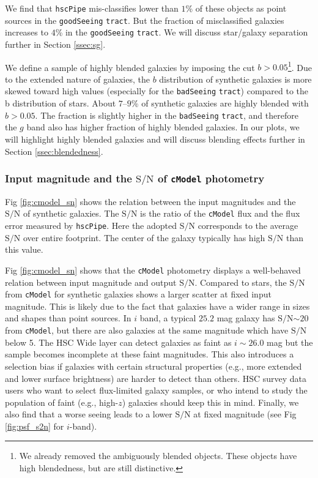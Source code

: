 \documentclass[useamsfonts]{pasj01}
\def\hscpipe{\texttt{hscPipe}}
\def\cmodel{\texttt{cModel}}
\def\tract{\texttt{tract}}
\def\s2n{{$\mathrm{S}/\mathrm{N}$}}
\begin{document}
    We find that \hscpipe{} mis-classifies lower than $1$\% of these objects as 
    point sources in the \texttt{goodSeeing} \tract{}.
    But the fraction of misclassified galaxies increases to $4$\% in the
    \texttt{goodSeeing} \tract{}. 
    We will discuss star/galaxy separation further in Section \ref{ssec:sg}.

    We define a sample of highly blended galaxies by imposing the cut 
    $b>0.05$\footnote{We already removed the ambiguously blended objects. 
    These objects have high blendedness, but are still distinctive.}.
    Due to the extended nature of galaxies, the $b$ distribution of synthetic 
    galaxies is more skewed toward high values (especially for the \texttt{badSeeing}
    \tract{}) compared to the b distribution of stars.
    About $7$--$9$\% of synthetic galaxies are highly blended with $b>0.05$.
    The fraction is slightly higher in the \texttt{badSeeing} \tract{}, and 
    therefore the $g$ band also has higher fraction of highly blended galaxies.
    In our plots, we will highlight highly blended galaxies and will discuss 
    blending effects further in Section \ref{ssec:blendedness}.

\subsubsection{Input magnitude and the \s2n{} of \cmodel{} photometry}

    Fig \ref{fig:cmodel_sn} shows the relation between the input magnitudes and the 
    \s2n{} of synthetic galaxies.  
    The \s2n{} is the ratio  of the \cmodel{} flux and the flux error measured by 
    \hscpipe{}.
    Here the adopted \s2n{} corresponds to the average \s2n{} over entire footprint. 
    The center of the galaxy typically has high \s2n{} than this value.    

    Fig \ref{fig:cmodel_sn} shows that the \cmodel{} photometry displays a 
    well-behaved relation between input magnitude and output \s2n{}.  
    Compared to stars, the \s2n{} from \cmodel{} for synthetic galaxies shows a larger
    scatter at fixed input magnitude. 
    This is likely due to the fact that galaxies have a wider range in sizes and shapes 
    than point sources.  
    In $i$ band, a typical $25.2$ mag galaxy has \s2n{}${\sim}20$ from \cmodel{}, but 
    there are also galaxies at the same magnitude which have \s2n{} below 5. 
    The HSC Wide layer can detect galaxies as faint as $i{\sim}26.0$ mag but the 
    sample becomes incomplete at these faint magnitudes.
    This also introduces a selection bias if galaxies with certain structural 
    properties (e.g., more extended and lower surface brightness) are harder to detect
    than others.
    HSC survey data users who want to select flux-limited galaxy samples,
    or who intend to study the population of faint (e.g., high-$z$) galaxies should
    keep this in mind.  
    Finally, we also find that a worse seeing leads to a lower \s2n{} at fixed 
    magnitude (see Fig \ref{fig:psf_s2n} for $i$-band).
\end{document}
